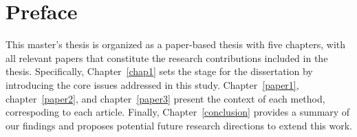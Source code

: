 \chapter*{Preface}

This master's thesis is organized as a paper-based thesis with five chapters, with all relevant papers that constitute the research contributions included in the thesis. Specifically, Chapter~\ref{chap1} sets the stage for the dissertation by introducing the core issues addressed in this study. Chapter~\ref{paper1}, chapter~\ref{paper2}, and  chapter~\ref{paper3} present the context of each method, correspoding to each article. Finally, Chapter~\ref{conclusion} provides a summary of our findings and proposes potential future research directions to extend this work.